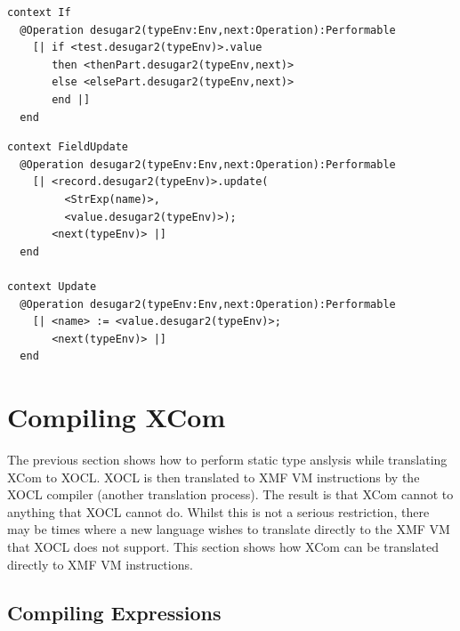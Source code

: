 \begin{lstlisting}
context If
  @Operation desugar2(typeEnv:Env,next:Operation):Performable
    [| if <test.desugar2(typeEnv)>.value
       then <thenPart.desugar2(typeEnv,next)>
       else <elsePart.desugar2(typeEnv,next)>
       end |]
  end
\end{lstlisting}\begin{lstlisting}
context FieldUpdate
  @Operation desugar2(typeEnv:Env,next:Operation):Performable
    [| <record.desugar2(typeEnv)>.update(
         <StrExp(name)>,
         <value.desugar2(typeEnv)>);
       <next(typeEnv)> |]
  end

context Update
  @Operation desugar2(typeEnv:Env,next:Operation):Performable
    [| <name> := <value.desugar2(typeEnv)>;
       <next(typeEnv)> |]
  end
\end{lstlisting}
\section{Compiling XCom}

The previous section shows how to perform static type anslysis while
translating XCom to XOCL. XOCL is then translated to XMF VM instructions
by the XOCL compiler (another translation process). The result is
that XCom cannot to anything that XOCL cannot do. Whilst this is not
a serious restriction, there may be times where a new language wishes
to translate directly to the XMF VM that XOCL does not support. This
section shows how XCom can be translated directly to XMF VM instructions.


\subsection{Compiling Expressions}

